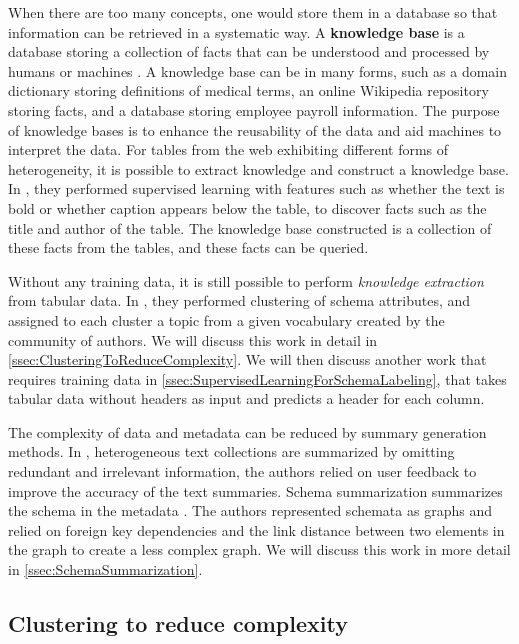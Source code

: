 When there are too many concepts, one would store them in a database so that information can be retrieved in a systematic way. A \textbf{\gls{knowledge base}} is a database storing a collection of facts that can be understood and processed by humans or machines \cite{Zhang2018Managing}. A knowledge base can be in many forms, such as a domain dictionary storing definitions of medical terms, an online Wikipedia repository storing facts, and a database storing employee payroll information. The purpose of knowledge bases is to enhance the reusability of the data and aid machines to interpret the data. For tables from the web exhibiting different forms of heterogeneity, it is possible to extract knowledge and construct a knowledge base. In \cite{10.1145/3183713.3183729}, they performed supervised learning with features such as whether the text is bold or whether caption appears below the table, to discover facts such as the title and author of the table. The knowledge base constructed is a collection of these facts from the tables, and these facts can be queried.

Without any training data, it is still possible to perform \textit{knowledge extraction} from tabular data. In \cite{Smith2011Unity}, they performed clustering of schema attributes, and assigned to each cluster a topic from a given vocabulary created by the community of authors. We will discuss this work in detail in \autoref{ssec:ClusteringToReduceComplexity}. We will then discuss another work that requires training data \cite{10.1145/3184558.3191601} in \autoref{ssec:SupervisedLearningForSchemaLabeling}, that takes tabular data without headers as input and predicts a header for each column.

The complexity of data and metadata can be reduced by summary generation methods. In \cite{Benjamin2019Interactive}, heterogeneous text collections are summarized by omitting redundant and irrelevant information, the authors relied on user feedback to improve the accuracy of the text summaries. Schema summarization summarizes the schema in the metadata \cite{Yu2006Schema}. The authors represented schemata as graphs and relied on foreign key dependencies and the link distance between two elements in the graph to create a less complex graph. We will discuss this work in more detail in \autoref{ssec:SchemaSummarization}.

\subsection{Clustering to reduce complexity}
\label{ssec:ClusteringToReduceComplexity}

